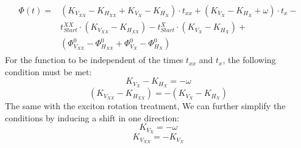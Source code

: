 \begin{equation}
	\begin{split}  
		\begin{aligned} 
			\Phi(t) = &(K_{V_{XX}}-K_{H_{XX}}+K_{V_X} - K_{H_X})\cdot t_{xx}+(K_{V_X}-K_{H_X} + \omega)\cdot t_x -\\
			&t^{XX}_{Start} \cdot(K_{V_{XX}} - K_{H_{XX}})-t^X_{Start} \cdot(K_{V_X}-K_{H_X})+\\
			&(\Phi^0_{V_{XX}}-\Phi^0_{H_{XX}}+\Phi^0_{V_{X}}-\Phi^0_{H_{X}})
		\end{aligned}
	\end{split}
\end{equation}
For the function to be independent of the times $t_{xx}$ and $t_{x}$, the following condition must be met:
\begin{equation}
	K_{V_X}-K_{H_X} = -\omega
\end{equation}
\begin{equation}
	(K_{V_{XX}} -K_{H_{XX}}) = -(K_{V_X}-K_{H_X})
\end{equation}
The same with the exciton rotation treatment, We can further simplify the conditions by inducing a shift in one direction:
\begin{equation}
	K_{V_X} = -\omega
\end{equation}
\begin{equation}
	K_{V_{XX}} = -K_{V_X}
\end{equation}